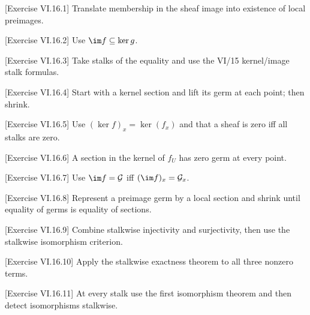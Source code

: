 \begin{hint}
[Exercise VI.16.1]
Translate membership in the sheaf image into existence of local preimages.
\end{hint}

\begin{hint}
[Exercise VI.16.2]
Use $\im f\subseteq\ker g$.
\end{hint}

\begin{hint}
[Exercise VI.16.3]
Take stalks of the equality and use the VI/15 kernel/image stalk formulas.
\end{hint}

\begin{hint}
[Exercise VI.16.4]
Start with a kernel section and lift its germ at each point; then shrink.
\end{hint}

\begin{hint}
[Exercise VI.16.5]
Use $(\ker f)_x=\ker(f_x)$ and that a sheaf is zero iff all stalks are zero.
\end{hint}

\begin{hint}
[Exercise VI.16.6]
A section in the kernel of $f_U$ has zero germ at every point.
\end{hint}

\begin{hint}
[Exercise VI.16.7]
Use $\im f=\G$ iff $(\im f)_x=\G_x$.
\end{hint}

\begin{hint}
[Exercise VI.16.8]
Represent a preimage germ by a local section and shrink until equality of germs is equality of sections.
\end{hint}

\begin{hint}
[Exercise VI.16.9]
Combine stalkwise injectivity and surjectivity, then use the stalkwise isomorphism criterion.
\end{hint}

\begin{hint}
[Exercise VI.16.10]
Apply the stalkwise exactness theorem to all three nonzero terms.
\end{hint}

\begin{hint}
[Exercise VI.16.11]
At every stalk use the first isomorphism theorem and then detect isomorphisms stalkwise.
\end{hint}

